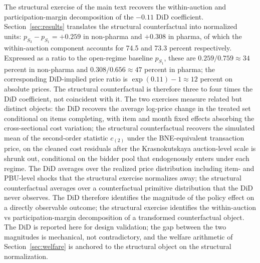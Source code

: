 The structural exercise of the main text recovers the within-auction and participation-margin decomposition of the $-0.11$ DiD coefficient. Section~\ref{sec:results} translates the structural counterfactual into normalized units: $p_{S_3} - p_{S_1} = +0.259$ in non-pharma and $+0.308$ in pharma, of which the within-auction component accounts for 74.5 and 73.3 percent respectively. Expressed as a ratio to the open-regime baseline $p_{S_1}$, these are $0.259/0.759 \approx 34$ percent in non-pharma and $0.308/0.656 \approx 47$ percent in pharma; the corresponding DiD-implied price ratio is $\exp(0.11) - 1 \approx 12$ percent on absolute prices. The structural counterfactual is therefore three to four times the DiD coefficient, not coincident with it. The two exercises measure related but distinct objects: the DiD recovers the average log-price change in the treated set conditional on items completing, with item and month fixed effects absorbing the cross-sectional cost variation; the structural counterfactual recovers the simulated mean of the second-order statistic $c_{(2)}$ under the BNE-equivalent transaction price, on the cleaned cost residuals after the Krasnokutskaya auction-level scale is shrunk out, conditional on the bidder pool that endogenously enters under each regime. The DiD averages over the realized price distribution including item- and PBU-level shocks that the structural exercise normalizes away; the structural counterfactual averages over a counterfactual primitive distribution that the DiD never observes. The DiD therefore identifies the magnitude of the policy effect on a directly observable outcome; the structural exercise identifies the within-auction vs participation-margin decomposition of a transformed counterfactual object. The DiD is reported here for design validation; the gap between the two magnitudes is mechanical, not contradictory, and the welfare arithmetic of Section~\ref{sec:welfare} is anchored to the structural object on the structural normalization.
